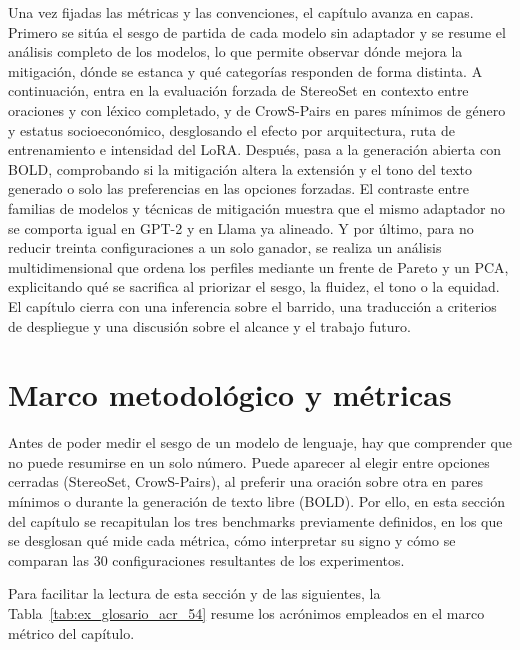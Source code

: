 \documentclass[12pt,a4paper]{report}
\begin{document}
Una vez fijadas las métricas y las convenciones, el capítulo avanza en capas. Primero se sitúa el sesgo de partida de cada modelo sin adaptador y se resume el análisis completo de los modelos, lo que permite observar dónde mejora la mitigación, dónde se estanca y qué categorías responden de forma distinta. A continuación, entra en la evaluación forzada de StereoSet en contexto entre oraciones y con léxico completado, y de CrowS-Pairs en pares mínimos de género y estatus socioeconómico, desglosando el efecto por arquitectura, ruta de entrenamiento e intensidad del LoRA. Después, pasa a la generación abierta con BOLD, comprobando si la mitigación altera la extensión y el tono del texto generado o solo las preferencias en las opciones forzadas. El contraste entre familias de modelos y técnicas de mitigación muestra que el mismo adaptador no se comporta igual en GPT-2 y en Llama ya alineado. Y por último, para no reducir treinta configuraciones a un solo ganador, se realiza un análisis multidimensional que ordena los perfiles mediante un frente de Pareto y un PCA, explicitando qué se sacrifica al priorizar el sesgo, la fluidez, el tono o la equidad. El capítulo cierra con una inferencia sobre el barrido, una traducción a criterios de despliegue y una discusión sobre el alcance y el trabajo futuro.

\section{Marco metodológico y métricas}
\label{sec:ex_metricas}

Antes de poder medir el sesgo de un modelo de lenguaje, hay que comprender que no puede resumirse en un solo número. Puede aparecer al elegir entre opciones cerradas (StereoSet, CrowS-Pairs), al preferir una oración sobre otra en pares mínimos o durante la generación de texto libre (BOLD). Por ello, en esta sección del capítulo se recapitulan los tres benchmarks previamente definidos, en los que se desglosan qué mide cada métrica, cómo interpretar su signo y cómo se comparan las 30 configuraciones resultantes de los experimentos.

Para facilitar la lectura de esta sección y de las siguientes, la Tabla~\ref{tab:ex_glosario_acr_54} resume los acrónimos empleados en el marco métrico del capítulo.
\end{document}
